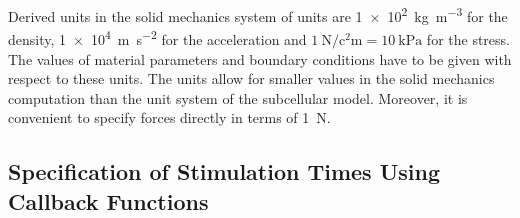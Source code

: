 Derived units in the solid mechanics system of units are \SI{1e2}{\kilogram\per\meter\cubed} for the density, \SI{1e4}{\meter\per\square\second} for the acceleration and $\SI{1}{\newton\per\square\centi\meter} = \SI{10}{\kilo\pascal}$ for the stress. The values of material parameters and boundary conditions have to be given with respect to these units.
The units allow for smaller values in the solid mechanics computation than the unit system of the subcellular model. Moreover, it is  convenient to specify forces directly in terms of \SI{1}{\newton}.

% 
% 
% 
% 

\subsection{Specification of Stimulation Times Using Callback Functions}

